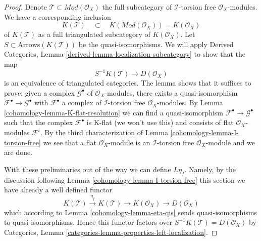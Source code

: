 \begin{proof}

Denote $\mathcal{T} \subset \textit{Mod}(\mathcal{O}_X)$ the full subcategory
of $\mathcal{I}$-torsion free $\mathcal{O}_X$-modules.
We have a corresponding inclusion
$$
K(\mathcal{T})
\quad\subset\quad
K(\textit{Mod}(\mathcal{O}_X)) = K(\mathcal{O}_X)
$$
of $K(\mathcal{T})$ as a full triangulated subcategory of $K(\mathcal{O}_X)$.
Let $S \subset \text{Arrows}(K(\mathcal{T}))$ be the quasi-isomorphisms.
We will apply
Derived Categories, Lemma \ref{derived-lemma-localization-subcategory}
to show that the map
$$
S^{-1}K(\mathcal{T}) \longrightarrow D(\mathcal{O}_X)
$$
is an equivalence of triangulated categories. The lemma shows that
it suffices to prove: given a complex $\mathcal{G}^\bullet$ of
$\mathcal{O}_X$-modules,
there exists a quasi-isomorphism $\mathcal{F}^\bullet \to \mathcal{G}^\bullet$
with $\mathcal{F}^\bullet$
a complex of $\mathcal{I}$-torsion free $\mathcal{O}_X$-modules.
By Lemma \ref{cohomology-lemma-K-flat-resolution} we can find a quasi-isomorphism
$\mathcal{F}^\bullet \to \mathcal{G}^\bullet$ such that the complex
$\mathcal{F}^\bullet$ is K-flat (we won't use this) and
consists of flat $\mathcal{O}_X$-modules $\mathcal{F}^i$.
By the third characterization of Lemma \ref{cohomology-lemma-I-torsion-free}
we see that a flat $\mathcal{O}_X$-module is an
$\mathcal{I}$-torsion free $\mathcal{O}_X$-module
and we are done.

\medskip\noindent
With these preliminaries out of the way we can define $L\eta_f$.
Namely, by the discussion following Lemma \ref{cohomology-lemma-I-torsion-free}
this section we have already a well defined functor
$$
K(\mathcal{T}) \xrightarrow{\eta_f} K(\mathcal{T}) \to
K(\mathcal{O}_X) \to D(\mathcal{O}_X)
$$
which according to Lemma \ref{cohomology-lemma-eta-qis} sends quasi-isomorphisms
to quasi-isomorphisms. Hence this functor factors over
$S^{-1}K(\mathcal{T}) = D(\mathcal{O}_X)$ by
Categories, Lemma \ref{categories-lemma-properties-left-localization}.
\end{proof}

